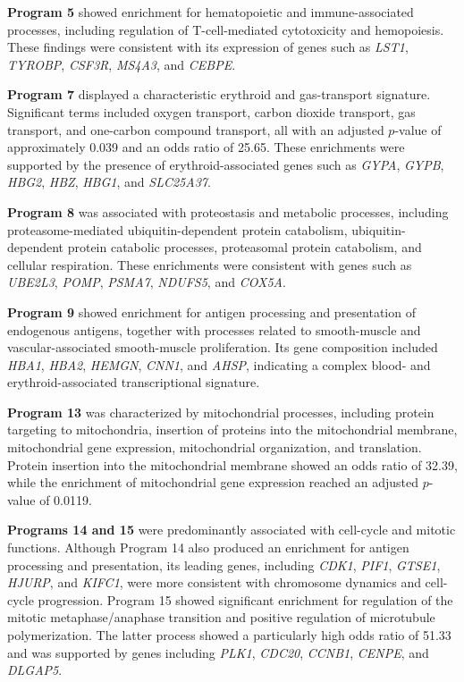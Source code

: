 \documentclass[11pt,a4paper]{article}
\begin{document}
\textbf{Program 5} showed enrichment for hematopoietic and immune-associated processes, including regulation of T-cell-mediated cytotoxicity and hemopoiesis. These findings were consistent with its expression of genes such as \textit{LST1}, \textit{TYROBP}, \textit{CSF3R}, \textit{MS4A3}, and \textit{CEBPE}.

\textbf{Program 7} displayed a characteristic erythroid and gas-transport signature. Significant terms included oxygen transport, carbon dioxide transport, gas transport, and one-carbon compound transport, all with an adjusted $p$-value of approximately 0.039 and an odds ratio of 25.65. These enrichments were supported by the presence of erythroid-associated genes such as \textit{GYPA}, \textit{GYPB}, \textit{HBG2}, \textit{HBZ}, \textit{HBG1}, and \textit{SLC25A37}. 

\textbf{Program 8} was associated with proteostasis and metabolic processes, including proteasome-mediated ubiquitin-dependent protein catabolism, ubiquitin-dependent protein catabolic processes, proteasomal protein catabolism, and cellular respiration. These enrichments were consistent with genes such as \textit{UBE2L3}, \textit{POMP}, \textit{PSMA7}, \textit{NDUFS5}, and \textit{COX5A}.

\textbf{Program 9} showed enrichment for antigen processing and presentation of endogenous antigens, together with processes related to smooth-muscle and vascular-associated smooth-muscle proliferation. Its gene composition included \textit{HBA1}, \textit{HBA2}, \textit{HEMGN}, \textit{CNN1}, and \textit{AHSP}, indicating a complex blood- and erythroid-associated transcriptional signature. 

\textbf{Program 13} was characterized by mitochondrial processes, including protein targeting to mitochondria, insertion of proteins into the mitochondrial membrane, mitochondrial gene expression, mitochondrial organization, and translation. Protein insertion into the mitochondrial membrane showed an odds ratio of 32.39, while the enrichment of mitochondrial gene expression reached an adjusted $p$-value of 0.0119.

\textbf{Programs 14 and 15} were predominantly associated with cell-cycle and mitotic functions. Although Program 14 also produced an enrichment for antigen processing and presentation, its leading genes, including \textit{CDK1}, \textit{PIF1}, \textit{GTSE1}, \textit{HJURP}, and \textit{KIFC1}, were more consistent with chromosome dynamics and cell-cycle progression. Program 15 showed significant enrichment for regulation of the mitotic metaphase/anaphase transition and positive regulation of microtubule polymerization. The latter process showed a particularly high odds ratio of 51.33 and was supported by genes including \textit{PLK1}, \textit{CDC20}, \textit{CCNB1}, \textit{CENPE}, and \textit{DLGAP5}.
\end{document}
